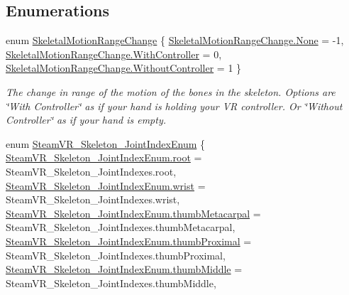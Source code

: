 \subsection*{Enumerations}
\begin{DoxyCompactItemize}
\item 
enum \mbox{\hyperlink{namespace_valve_1_1_v_r_aabb506007a41244de5c315ff5519439f}{Skeletal\+Motion\+Range\+Change}} \{ \mbox{\hyperlink{namespace_valve_1_1_v_r_aabb506007a41244de5c315ff5519439fa6adf97f83acf6453d4a6a4b1070f3754}{Skeletal\+Motion\+Range\+Change.\+None}} = -\/1, 
\mbox{\hyperlink{namespace_valve_1_1_v_r_aabb506007a41244de5c315ff5519439fa9d356b6969fbb990969ed49bfc6f7246}{Skeletal\+Motion\+Range\+Change.\+With\+Controller}} = 0, 
\mbox{\hyperlink{namespace_valve_1_1_v_r_aabb506007a41244de5c315ff5519439fa410e70ab7664c51ec348aecbe772ae58}{Skeletal\+Motion\+Range\+Change.\+Without\+Controller}} = 1
 \}
\begin{DoxyCompactList}\small\item\em The change in range of the motion of the bones in the skeleton. Options are \char`\"{}\+With Controller\char`\"{} as if your hand is holding your VR controller. Or \char`\"{}\+Without Controller\char`\"{} as if your hand is empty. \end{DoxyCompactList}\item 
enum \mbox{\hyperlink{namespace_valve_1_1_v_r_a99f7cc968994699a7485078bafddac17}{Steam\+V\+R\+\_\+\+Skeleton\+\_\+\+Joint\+Index\+Enum}} \{ \newline
\mbox{\hyperlink{namespace_valve_1_1_v_r_a99f7cc968994699a7485078bafddac17a63a9f0ea7bb98050796b649e85481845}{Steam\+V\+R\+\_\+\+Skeleton\+\_\+\+Joint\+Index\+Enum.\+root}} = Steam\+V\+R\+\_\+\+Skeleton\+\_\+\+Joint\+Indexes.\+root, 
\mbox{\hyperlink{namespace_valve_1_1_v_r_a99f7cc968994699a7485078bafddac17a5f412bd74e8ece87b8e45743c8c1e014}{Steam\+V\+R\+\_\+\+Skeleton\+\_\+\+Joint\+Index\+Enum.\+wrist}} = Steam\+V\+R\+\_\+\+Skeleton\+\_\+\+Joint\+Indexes.\+wrist, 
\mbox{\hyperlink{namespace_valve_1_1_v_r_a99f7cc968994699a7485078bafddac17ab59ce44939db2a855fe2b751cebc8783}{Steam\+V\+R\+\_\+\+Skeleton\+\_\+\+Joint\+Index\+Enum.\+thumb\+Metacarpal}} = Steam\+V\+R\+\_\+\+Skeleton\+\_\+\+Joint\+Indexes.\+thumb\+Metacarpal, 
\mbox{\hyperlink{namespace_valve_1_1_v_r_a99f7cc968994699a7485078bafddac17acba6ce5dfffa9ef89c79dce020f729f8}{Steam\+V\+R\+\_\+\+Skeleton\+\_\+\+Joint\+Index\+Enum.\+thumb\+Proximal}} = Steam\+V\+R\+\_\+\+Skeleton\+\_\+\+Joint\+Indexes.\+thumb\+Proximal, 
\newline
\mbox{\hyperlink{namespace_valve_1_1_v_r_a99f7cc968994699a7485078bafddac17ab715ce3e4e228823d696f9b43e0229eb}{Steam\+V\+R\+\_\+\+Skeleton\+\_\+\+Joint\+Index\+Enum.\+thumb\+Middle}} = Steam\+V\+R\+\_\+\+Skeleton\+\_\+\+Joint\+Indexes.\+thumb\+Middle, 

\end{DoxyCompactItemize}
